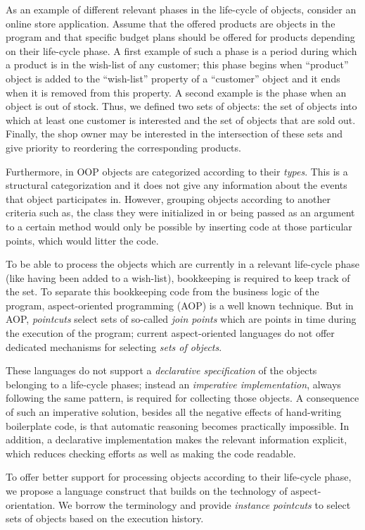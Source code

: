 \documentclass{llncs}
\begin{document}
As an example of different relevant phases in the life-cycle of objects, consider an online store application. Assume that the offered products are objects in the program and that specific budget plans should be offered for products depending on their life-cycle phase. A first example of such a phase is a period during which a product is in the wish-list of any customer; this phase begins when ``product'' object is added to the ``wish-list'' property of a ``customer'' object and it ends when it is removed from this property. A second example is the phase when an object is out of stock. Thus, we defined two sets of objects: the set of objects into which at least one customer is interested and the set of objects that are sold out. Finally, the shop owner may be interested in the intersection of these sets and give priority to reordering the corresponding products.

Furthermore, in OOP objects are categorized according to their \emph{types}.
This is a structural categorization and it does not give any information about the events that object participates in.
However, grouping objects according to another criteria such as, the class they were initialized in or being passed as an argument to a certain method would only be possible by inserting code at those particular points, which would litter the code.

To be able to process the objects which are currently in a relevant life-cycle phase (like having been added to a wish-list), bookkeeping is required to keep track of the set. To separate this bookkeeping code from the business logic of the program, aspect-oriented programming (AOP) is a well known technique. But in AOP, \emph{pointcuts} select sets of so-called \emph{join points} which are points in time during the execution of the program; current aspect-oriented languages do not offer dedicated mechanisms for selecting \emph{sets of objects}.

These languages do not support a \emph{declarative specification} of the objects belonging to a life-cycle phases; instead an \emph{imperative implementation}, always following the same pattern, is required for collecting those objects.
A consequence of such an imperative solution, besides all the negative effects of hand-writing boilerplate code, is that automatic reasoning becomes practically impossible.
In addition, a declarative implementation makes the relevant information explicit, which reduces checking efforts as well as making the code readable.

To offer better support for processing objects according to their life-cycle phase, we propose a language construct that builds on the technology of aspect-orientation.
We borrow the terminology and provide \emph{instance pointcuts} to select sets of objects based on the execution history.
\end{document}
